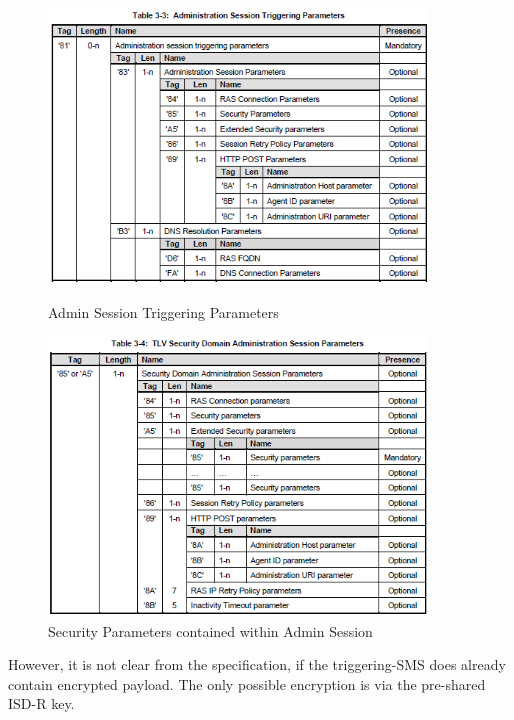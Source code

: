 \begin{figure}
    \centering
    \begin{minipage}{0.5\textwidth}
        \centering
        \includegraphics[width=0.9\textwidth]{pictures/adminSessTrigParam.png} %
        \caption{Admin Session Triggering Parameters \parencite{GPC:AmendB}}
    \end{minipage}\hfill
    \begin{minipage}{0.5\textwidth}
        \centering
        \includegraphics[width=0.9\textwidth]{pictures/secDomAdminSessParam.png} %
        \caption{Security Parameters contained within Admin Session \parencite{GPC:AmendB}}
    \end{minipage}
    \label{fig:APDUStruc}
\end{figure}
However, it is not clear from the specification, if the triggering-SMS does already contain encrypted payload. The only possible encryption is via the pre-shared ISD-R key.

